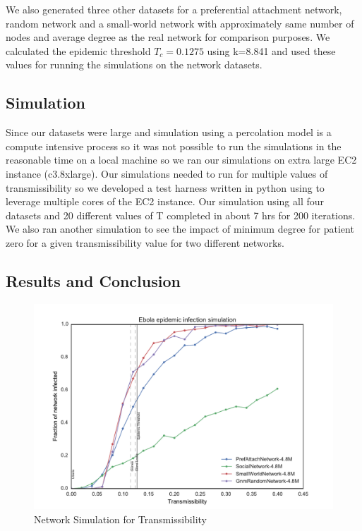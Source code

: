 \documentclass[10pt, journal,onecolumn]{IEEEtran}
\begin{document}
We also generated three other datasets  for a preferential attachment network, random network and a small-world network with approximately same number of nodes and average degree as the real network for comparison purposes. We calculated the epidemic threshold  $T_c=0.1275$  using k=8.841 and used these values for  running the simulations on the  network datasets.

\subsection*{\textbf{Simulation}}

Since our datasets were  large and simulation using a percolation model is a compute intensive process so it was not possible to run the simulations in the reasonable time on a local machine so we ran our simulations on  extra large EC2 instance (c3.8xlarge). Our simulations needed to run for multiple values  of transmissibility so we developed a test harness written in python using \cite{GNU-Parallel} to leverage  multiple  cores of the EC2 instance.  Our simulation using  all four datasets and 20 different values of T  completed in  about 7 hrs for 200 iterations. We also ran another simulation to see the impact of minimum degree for patient zero for a given transmissibility value for two different networks. 

\subsection*{\textbf{Results and Conclusion}}


\begin{figure}[ht]
\centering
\includegraphics[scale=.8]{EbolaNetworkSpread.pdf}
\caption{Network Simulation for Transmissibility}
\label{Fig:Network_Transmissibility}
\end{figure}
\end{document}
